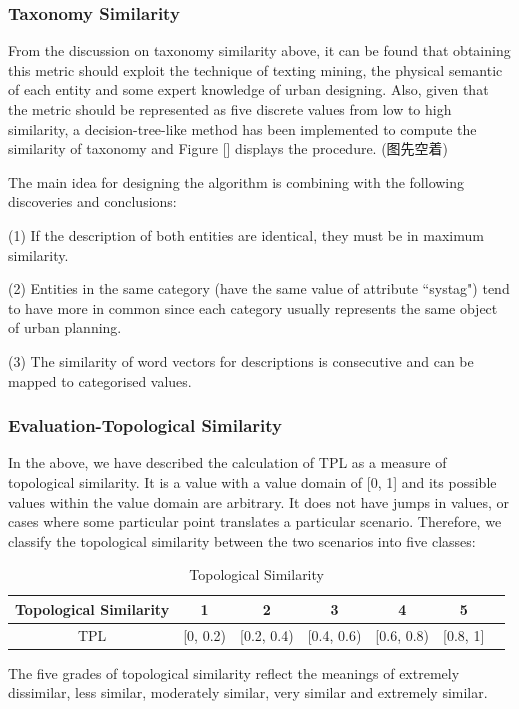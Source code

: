 \subsubsection*{Taxonomy Similarity}
From the discussion on taxonomy similarity above, it can be found that obtaining this metric should exploit the technique of texting mining, the physical semantic of each entity and some expert knowledge of urban designing. Also, given that the metric should be represented as five discrete values from low to high similarity, a decision-tree-like method has been implemented to compute the similarity of taxonomy and Figure [] displays the procedure.
(图先空着)
\par
The main idea for designing the algorithm is combining with the following discoveries and conclusions:
\par
(1) If the description of both entities are identical, they must be in maximum similarity.
\par
(2) Entities in the same category (have the same value of attribute ``systag") tend to have more in common since each category usually represents the same object of urban planning.
\par
(3) The similarity of word vectors for descriptions is consecutive and can be mapped to categorised values.
\subsubsection*{Evaluation-Topological Similarity}
In the above, we have described the calculation of TPL as a measure of topological similarity. It is a value with a value domain of [0, 1] and its possible values within the value domain are arbitrary. It does not have jumps in values, or cases where some particular point translates a particular scenario. Therefore, we classify the topological similarity between the two scenarios into five classes:

\begin{table}[H]
\centering
\caption{Topological Similarity}
\label{tab:my-table}
\begin{tabular}{|c|c|c|c|c|c|c|}
\hline
Topological Similarity & 1 & 2 & 3 & 4 & 5          \\ \hline
TPL & [0, 0.2) &  [0.2, 0.4) & [0.4, 0.6)  & [0.6, 0.8)  &[0.8, 1]   \\ \hline
\end{tabular}
\end{table}

The five grades of topological similarity reflect the meanings of extremely dissimilar, less similar, moderately similar, very similar and extremely similar.

